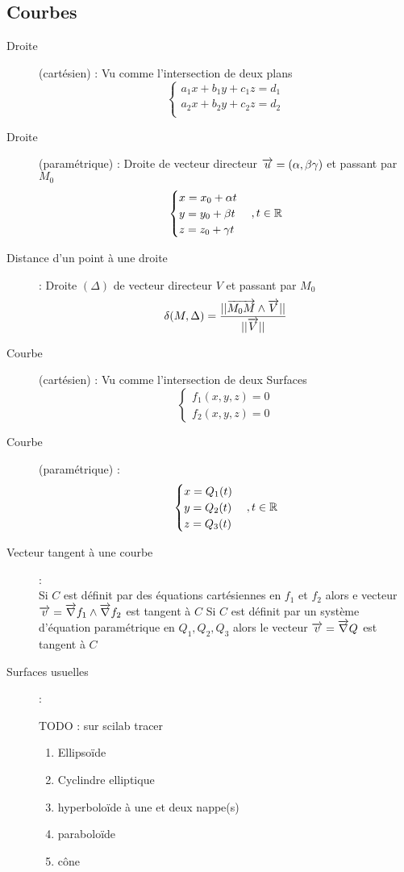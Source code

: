 \subsection{Courbes}
\begin{description}
\item[Droite] (cartésien) : Vu comme l'intersection de deux plans
    \[
        \begin{cases}
            a_1x+b_1y+c_1z=d_1\\
            a_2x+b_2y+c_2z=d_2\\
        \end{cases}
    \]
\item[Droite] (paramétrique) : Droite de vecteur directeur $\overrightarrow{u}=(\alpha,\beta\gamma)$ et passant par $M_0$ 
    \[
        \begin{cases}
            x=x_0+\alpha t\\
            y=y_0+\beta t\\
            z=z_0+\gamma t
        \end{cases}, t\in\mathbb{R}
    \]
\item[Distance d'un point à une droite] : Droite $(\Delta)$ de vecteur directeur $V$ et passant par $M_0$
    \[
        \delta(M,\Delta)=\frac{||\overrightarrow{M_0M}\land\overrightarrow{V}||}{||\overrightarrow{V}||}
    \]
\item[Courbe] (cartésien) : Vu comme l'intersection de deux Surfaces
    \[
        \begin{cases}
            f_1(x,y,z)=0\\
            f_2(x,y,z)=0
        \end{cases}
    \]
\item[Courbe] (paramétrique) :
    \[
        \begin{cases}
            x=Q_1(t)\\
            y=Q_2(t)\\
            z=Q_3(t)
        \end{cases}, t\in\mathbb{R}
    \]
\item[Vecteur tangent à une courbe] :\\
        Si $C$ est définit par des équations cartésiennes en $f_1$ et $f_2$ alors e vecteur $\overrightarrow{v}=\overrightarrow{\nabla} f_1\land\overrightarrow{\nabla} f_2$ est tangent à $C$
        Si $C$ est définit par un système d'équation paramétrique en $Q_1,Q_2,Q_3$ alors le vecteur $\overrightarrow{v}=\overrightarrow{\nabla} Q$ est tangent à $C$
\item[Surfaces usuelles] :
    \begin{center}
        TODO : sur scilab tracer
        \begin{enumerate}
            \item Ellipsoïde
            \item Cyclindre elliptique
            \item hyperboloïde à une et deux nappe(s)
            \item paraboloïde
            \item cône
        \end{enumerate}
    \end{center}
\end{description}
